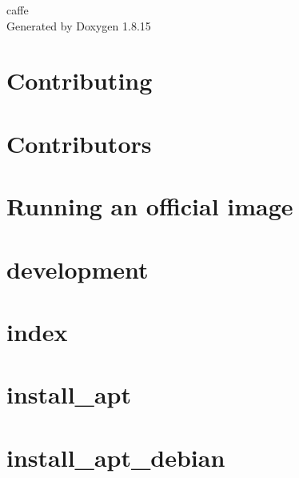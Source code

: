 \documentclass[twoside]{book}
\newcommand{\+}{\discretionary{\mbox{\scriptsize$\hookleftarrow$}}{}{}}
\newcommand{\clearemptydoublepage}{%
  \newpage{\pagestyle{empty}\cleardoublepage}%
}
\begin{document}
\hypersetup{pageanchor=false,
             bookmarksnumbered=true,
             pdfencoding=unicode
            }
\begin{titlepage}
\vspace*{7cm}
\begin{center}%
{\Large caffe }\\
\vspace*{1cm}
{\large Generated by Doxygen 1.8.15}\\
\end{center}
\end{titlepage}
\clearemptydoublepage
{}
\tableofcontents
\clearemptydoublepage
{}
\hypersetup{pageanchor=true}

\chapter{Contributing}
\label{md__c_o_n_t_r_i_b_u_t_i_n_g}

\chapter{Contributors}
\label{md__c_o_n_t_r_i_b_u_t_o_r_s}

\chapter{Running an official image}
\label{md_docker__r_e_a_d_m_e}

\chapter{development}
\label{md_docs_development}

\chapter{index}
\label{md_docs_index}

\chapter{install\+\_\+apt}
\label{md_docs_install_apt}

\chapter{install\+\_\+apt\+\_\+debian}
\label{md_docs_install_apt_debian}

\end{document}

